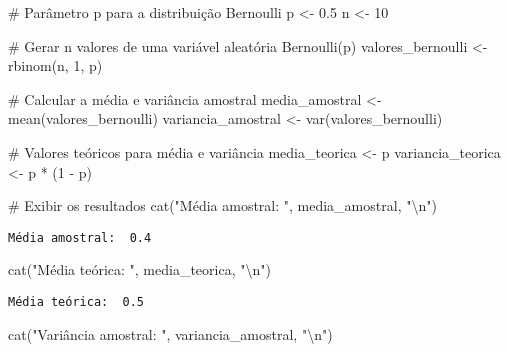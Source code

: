 \documentclass[
  letterpaper,
  DIV=11,
  numbers=noendperiod]{scrreprt}
\newenvironment{Shaded}{\begin{snugshade}}{\end{snugshade}}
\newcommand{\CommentTok}[1]{\textcolor[rgb]{0.37,0.37,0.37}{#1}}
\newcommand{\DecValTok}[1]{\textcolor[rgb]{0.68,0.00,0.00}{#1}}
\newcommand{\FloatTok}[1]{\textcolor[rgb]{0.68,0.00,0.00}{#1}}
\newcommand{\FunctionTok}[1]{\textcolor[rgb]{0.28,0.35,0.67}{#1}}
\newcommand{\NormalTok}[1]{\textcolor[rgb]{0.00,0.23,0.31}{#1}}
\newcommand{\OtherTok}[1]{\textcolor[rgb]{0.00,0.23,0.31}{#1}}
\newcommand{\SpecialCharTok}[1]{\textcolor[rgb]{0.37,0.37,0.37}{#1}}
\newcommand{\StringTok}[1]{\textcolor[rgb]{0.13,0.47,0.30}{#1}}
\begin{document}
\begin{Shaded}
\begin{Highlighting}[]
\CommentTok{\# Parâmetro p para a distribuição Bernoulli}
\NormalTok{p }\OtherTok{\textless{}{-}} \FloatTok{0.5}
\NormalTok{n }\OtherTok{\textless{}{-}} \DecValTok{10}

\CommentTok{\# Gerar n valores de uma variável aleatória Bernoulli(p)}
\NormalTok{valores\_bernoulli }\OtherTok{\textless{}{-}} \FunctionTok{rbinom}\NormalTok{(n, }\DecValTok{1}\NormalTok{, p)}

\CommentTok{\# Calcular a média e variância amostral}
\NormalTok{media\_amostral }\OtherTok{\textless{}{-}} \FunctionTok{mean}\NormalTok{(valores\_bernoulli)}
\NormalTok{variancia\_amostral }\OtherTok{\textless{}{-}} \FunctionTok{var}\NormalTok{(valores\_bernoulli)}

\CommentTok{\# Valores teóricos para média e variância}
\NormalTok{media\_teorica }\OtherTok{\textless{}{-}}\NormalTok{ p}
\NormalTok{variancia\_teorica }\OtherTok{\textless{}{-}}\NormalTok{ p }\SpecialCharTok{*}\NormalTok{ (}\DecValTok{1} \SpecialCharTok{{-}}\NormalTok{ p)}

\CommentTok{\# Exibir os resultados}
\FunctionTok{cat}\NormalTok{(}\StringTok{"Média amostral: "}\NormalTok{, media\_amostral, }\StringTok{"}\SpecialCharTok{\textbackslash{}n}\StringTok{"}\NormalTok{)}
\end{Highlighting}
\end{Shaded}

\begin{verbatim}
Média amostral:  0.4 
\end{verbatim}

\begin{Shaded}
\begin{Highlighting}[]
\FunctionTok{cat}\NormalTok{(}\StringTok{"Média teórica: "}\NormalTok{, media\_teorica, }\StringTok{"}\SpecialCharTok{\textbackslash{}n}\StringTok{"}\NormalTok{)}
\end{Highlighting}
\end{Shaded}

\begin{verbatim}
Média teórica:  0.5 
\end{verbatim}

\begin{Shaded}
\begin{Highlighting}[]
\FunctionTok{cat}\NormalTok{(}\StringTok{"Variância amostral: "}\NormalTok{, variancia\_amostral, }\StringTok{"}\SpecialCharTok{\textbackslash{}n}\StringTok{"}\NormalTok{)}
\end{Highlighting}
\end{Shaded}
\end{document}
